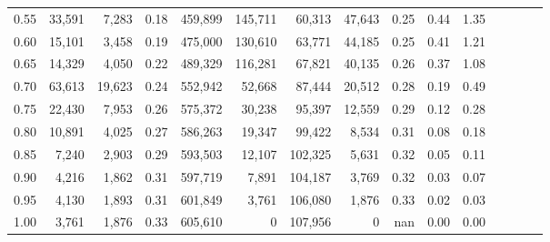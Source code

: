 \begin{tabular}{rrrcrrrrrrrrrrr}
0.55 &  33,591 &   7,283 &                                       0.18 &  459,899 &  145,711 &   60,313 &   47,643 &  0.25 &  0.44 &                         1.35 \\
0.60 &  15,101 &   3,458 &                                       0.19 &  475,000 &  130,610 &   63,771 &   44,185 &  0.25 &  0.41 &                         1.21 \\
0.65 &  14,329 &   4,050 &                                       0.22 &  489,329 &  116,281 &   67,821 &   40,135 &  0.26 &  0.37 &                         1.08 \\
0.70 &  63,613 &  19,623 &                                       0.24 &  552,942 &   52,668 &   87,444 &   20,512 &  0.28 &  0.19 &                         0.49 \\
0.75 &  22,430 &   7,953 &                                       0.26 &  575,372 &   30,238 &   95,397 &   12,559 &  0.29 &  0.12 &                         0.28 \\
0.80 &  10,891 &   4,025 &                                       0.27 &  586,263 &   19,347 &   99,422 &    8,534 &  0.31 &  0.08 &                         0.18 \\
0.85 &   7,240 &   2,903 &                                       0.29 &  593,503 &   12,107 &  102,325 &    5,631 &  0.32 &  0.05 &                         0.11 \\
0.90 &   4,216 &   1,862 &                                       0.31 &  597,719 &    7,891 &  104,187 &    3,769 &  0.32 &  0.03 &                         0.07 \\
0.95 &   4,130 &   1,893 &                                       0.31 &  601,849 &    3,761 &  106,080 &    1,876 &  0.33 &  0.02 &                         0.03 \\
1.00 &   3,761 &   1,876 &                                       0.33 &  605,610 &        0 &  107,956 &        0 &   nan &  0.00 &                         0.00 \\
\bottomrule
\end{tabular}
